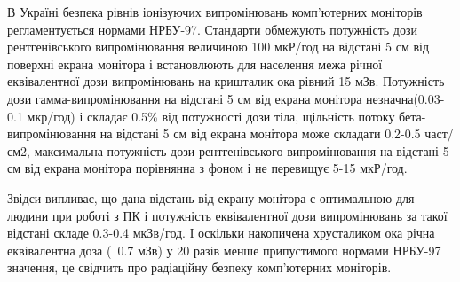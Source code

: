 В Україні безпека рівнів іонізуючих випромінювань комп'ютерних моніторів регламентується нормами НРБУ-97. Стандарти обмежують потужність дози рентгенівського випромінювання величиною 100 мкР/год на відстані 5 см від поверхні екрана монітора і встановлюють для населення межа річної еквівалентної дози випромінювань на кришталик ока рівний 15 мЗв. Потужність дози гамма-випромінювання на відстані 5 см від екрана монітора незначна(0.03-0.1 мкр/год) і складає 0.5\% від потужності дози тіла, щільність потоку бета-випромінювання на відстані 5 см від екрана монітора може складати 0.2-0.5 част/см2, максимальна потужність дози рентгенівського випромінювання на відстані 5 см від екрана монітора порівнянна з фоном і не перевищує 5-15 мкР/год. 

Звідси випливає, що дана відстань від екрану монітора є оптимальною для людини при роботі з ПК і потужність еквівалентної дози випромінювань за такої відстані складе 0.3-0.4 мкЗв/год. І оскільки накопичена хрусталиком ока річна еквівалентна доза (~0.7 мЗв) у 20 разів менше припустимого нормами НРБУ-97 значення, це свідчить про радіаційну безпеку комп'ютерних моніторів.


% 

